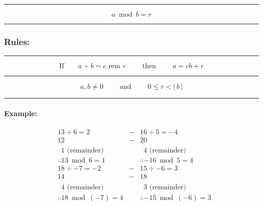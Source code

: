\documentclass[a5paper,9pt]{book}
\theoremstyle{definition}
\newcommand{\txtlinesur}[1]{%
    \vspace*{\baselineskip}

    \hrule%

    \vspace*{\medskipamount}

    #1

    \vspace*{\medskipamount}

    \hrule%

    \vspace*{\baselineskip}
}
\newcommand{\nomlinesur}[2]{%
    \vspace*{\baselineskip}

    \hrule%

    \vspace*{\medskipamount}

    #1

    \vspace*{\medskipamount}

    \hrule%

    \vspace*{\medskipamount}
    
    #2

    \vspace*{\medskipamount}

    \hrule

    \vspace*{\baselineskip}
}
\begin{document}
            \txtlinesur{%
                \begin{equation*}
                    a\bmod{b} = r
                \end{equation*}
            }

            \subsubsection{Rules:}

            \nomlinesur{%
                \begin{equation*}
                    \text{If}\qquad a\div b = c\text{ rem } r\qquad \text{ then }\qquad a = cb + r
                \end{equation*}

                \vspace*{-0.5\belowdisplayskip}
            }{%
                \vspace*{-0.5\abovedisplayskip}
                
                \begin{equation*}
                    a, b \neq 0 \qquad\text{ and }\qquad 0 \leq r < |\,b\,|
                \end{equation*}

                \vspace*{-0.5\belowdisplayskip}
            }

            \paragraph{Example:}

            \begin{align*}
                &13 \div 6 = 2 & -&16\div 5 = -4 \\[-5pt]
                &\underline{12} & -&\underline{20} \\[-5pt]
                &\phantom{0}1 \text{ (remainder)} & &\phantom{0}4 \text{ (remainder)} \\[5pt]
                &\therefore 13\bmod{6} = 1 & &\therefore -16\bmod{5} = 4 \\[25pt]
                 &18\div -7 = -2 & -&15\div -6 = 3 \\[-5pt]
                 &\underline{14} & -&\underline{18} \\[-5pt]
                 &\phantom{0}4 \text{ (remainder)} & &\phantom{0}3 \text{ (remainder)} \\[5pt]
                 &\therefore 18\bmod{(-7)} = 4 & &\therefore -15\bmod{(-6)} = 3 \\
            \end{align*}
\end{document}
